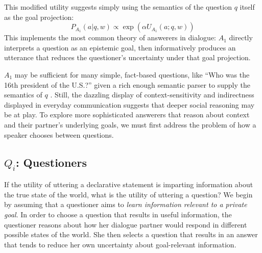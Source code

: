 \documentclass[11pt, floatsintext]{apa6}
\begin{document}
This modified utility suggests simply using the semantics of the question $q$ itself as the goal projection:
$$P_{A_1}(a|q,w) \propto \exp(\alpha U_{A_1}(a; q,w))$$
This implements the most common theory of answerers in dialogue: $A_1$ directly interprets a question as an epistemic goal, then informatively produces an utterance that reduces the questioner's uncertainty under that goal projection. 

$A_1$ may be sufficient for many simple, fact-based questions, like ``Who was the 16th president of the U.S.?'' given a rich enough semantic parser to supply the semantics of $q$ \cite{BerantChouFrostigLiang13_FreebaseQAPairs}. Still, the dazzling display of context-sensitivity and indirectness displayed in everyday communication suggests that deeper social reasoning may be at play. To explore more sophisticated answerers that reason about context and their partner's underlying goals, we must first address the problem of how a speaker chooses between questions.

\subsection{$Q_i$: Questioners}

If the utility of uttering a declarative statement is imparting information about the true state of the world, what is the utility of uttering a question? We begin by assuming that a questioner aims to \emph{learn information relevant to a private goal}.
%
In order to choose a question that results in useful information, the questioner reasons about how her dialogue partner would respond in different possible states of the world. She then selects a question that results in an answer that tends to reduce her own uncertainty about goal-relevant information.
%

\end{document}
